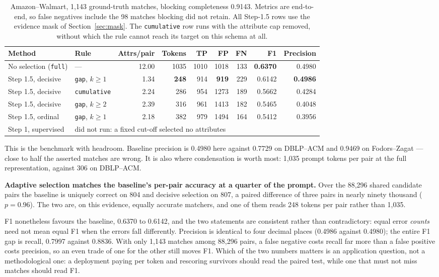 \documentclass[11pt]{article}
\begin{document}
\begin{table}[h]
\centering
\begin{tabular}{llrrrrrrr}
\toprule
Method & Rule & Attrs/pair & Tokens & TP & FP & FN & F1 & Precision \\
\midrule
No selection (\texttt{full}) & --- & 12.00 & 1035 & 1010 & 1018 & 133 & \textbf{0.6370} & 0.4980 \\
Step 1.5, decisive & \texttt{gap}, $k\!\ge\!1$ & 1.34 & \textbf{248} & 914 & \textbf{919} & 229 & 0.6142 & \textbf{0.4986} \\
Step 1.5, decisive & \texttt{cumulative} & 2.24 & 286 & 954 & 1273 & 189 & 0.5662 & 0.4284 \\
Step 1.5, decisive & \texttt{gap}, $k\!\ge\!2$ & 2.39 & 316 & 961 & 1413 & 182 & 0.5465 & 0.4048 \\
Step 1.5, ordinal & \texttt{gap}, $k\!\ge\!1$ & 2.18 & 382 & 979 & 1494 & 164 & 0.5412 & 0.3956 \\
Step 1, supervised & \multicolumn{8}{l}{did not run: a fixed cut-off selected no attributes} \\
\bottomrule
\end{tabular}
\caption{Amazon--Walmart, 1{,}143 ground-truth matches, blocking completeness 0.9143.
Metrics are end-to-end, so false negatives include the 98 matches blocking did not retain.
All Step-1.5 rows use the evidence mask of Section~\ref{sec:mask}. The \texttt{cumulative}
row runs with the attribute cap removed, without which the rule cannot reach its target on
this schema at all.}
\end{table}

This is the benchmark with headroom. Baseline precision is 0.4980 here against 0.7729 on
DBLP--ACM and 0.9469 on Fodors--Zagat --- close to half the asserted matches are wrong. It
is also where condensation is worth most: 1{,}035 prompt tokens per pair at the full
representation, against 306 on DBLP--ACM.

\textbf{Adaptive selection matches the baseline's per-pair accuracy at a quarter of the
prompt.} Over the 88{,}296 shared candidate pairs the baseline is uniquely correct on 804
and decisive selection on 807, a paired difference of three pairs in nearly ninety thousand
($p = 0.96$). The two are, on this evidence, equally accurate matchers, and one of them
reads 248 tokens per pair rather than 1{,}035.

F1 nonetheless favours the baseline, 0.6370 to 0.6142, and the two statements are
consistent rather than contradictory: equal error \emph{counts} need not mean equal F1 when
the errors fall differently. Precision is identical to four decimal places (0.4986 against
0.4980); the entire F1 gap is recall, 0.7997 against 0.8836. With only 1{,}143 matches among
88{,}296 pairs, a false negative costs recall far more than a false positive costs precision,
so an even trade of one for the other still moves F1. Which of the two numbers matters is an
application question, not a methodological one: a deployment paying per token and rescoring
survivors should read the paired test, while one that must not miss matches should read F1.
\end{document}
